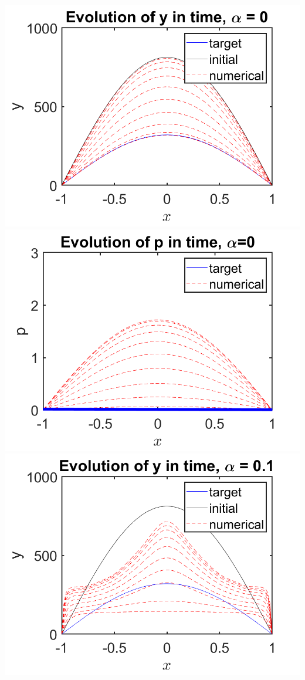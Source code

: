 \documentclass[a0,portrait]{a0poster}
\begin{document}
\begin{multicols}{2}
\begin{center}
		\includegraphics[scale=0.75]{Rhoalpha0.png}
		\includegraphics[scale=0.75]{qalpha0.png}
		\includegraphics[scale=0.75]{Rhoalpha01.png}

\end{center}
\end{multicols}
\end{document}

